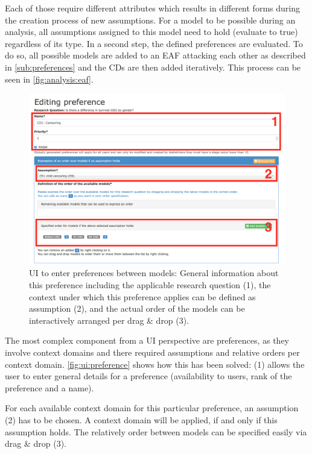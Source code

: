 Each of those require different attributes which results in different forms during the creation process of new assumptions. For a model to be possible during an analysis, all assumptions assigned to this model need to hold (evaluate to true) regardless of its type. In a second step, the defined \glspl{preference} are evaluated. To do so, all possible models are added to an \gls{EAF} attacking each other as described in \autoref{sub:preferences} and the \glspl{CD} are then added iteratively. This process can be seen in \autoref{fig:analysis:eaf}.

\begin{figure}[!hbt]
	\centering
	\includegraphics[width=\textwidth]{figures/ui_preference}
	\caption{\gls{UI} to enter preferences between models: General information about this preference including the applicable research question (1), the context under which this preference applies can be defined as assumption (2), and the actual order of the models can be interactively arranged per drag \& drop (3).}
	\label{fig:ui:preference}
\end{figure}


The most complex component from a \gls{UI} perspective are preferences, as they involve context domains and there required assumptions and relative orders per context domain. \autoref{fig:ui:preference} shows how this has been solved: (1) allows the user to enter general details for a preference (availability to users, rank of the preference and a name). 

For each available context domain for this particular preference, an assumption (2) has to be chosen. A context domain will be applied, if and only if this assumption holds. The relatively order between models can be specified easily via drag \& drop (3). 

